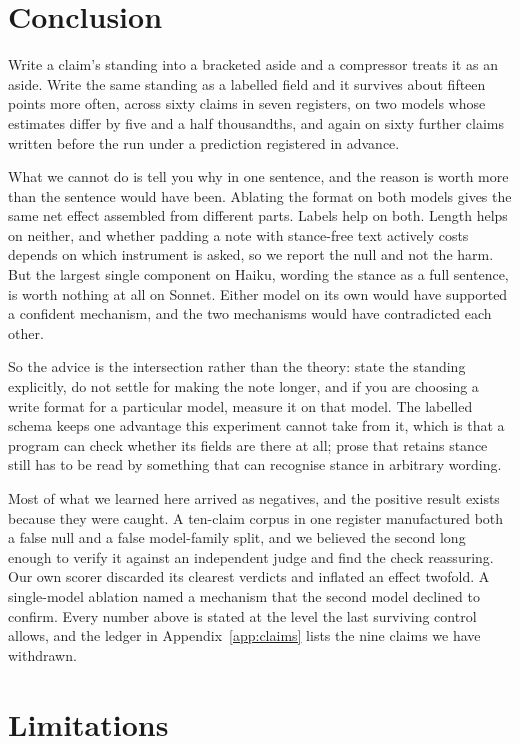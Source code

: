 \documentclass[11pt]{article}
\begin{document}
\section{Conclusion}

Write a claim's standing into a bracketed aside and a compressor treats it as an aside.
Write the same standing as a labelled field and it survives about fifteen points more
often, across sixty claims in seven registers, on two models whose estimates differ by five and a half thousandths, and again on sixty further claims written before the run under a
prediction registered in advance.

What we cannot do is tell you why in one sentence, and the reason is worth more than the
sentence would have been. Ablating the format on both models gives the same net effect
assembled from different parts. Labels help on both. Length helps on neither, and whether
padding a note with stance-free text actively costs depends on which instrument is asked,
so we report the null and not the harm. But the largest single
component on Haiku, wording the stance as a full sentence, is worth nothing at all on
Sonnet. Either model on its own would have supported a confident mechanism, and the two
mechanisms would have contradicted each other.

So the advice is the intersection rather than the theory: state the standing explicitly,
do not settle for making the note longer, and if you are choosing a write format for a
particular model, measure it on that model. The labelled schema keeps one advantage this
experiment cannot take from it, which is that a program can check whether its fields are
there at all; prose that retains stance still has to be read by something that can
recognise stance in arbitrary wording.

Most of what we learned here arrived as negatives, and the positive result exists because
they were caught. A ten-claim corpus in one register manufactured both a false null and a
false model-family split, and we believed the second long enough to verify it against an
independent judge and find the check reassuring. Our own scorer discarded its clearest
verdicts and inflated an effect twofold. A single-model ablation named a mechanism that
the second model declined to confirm. Every number above is stated at the level the last
surviving control allows, and the ledger in Appendix~\ref{app:claims} lists the nine
claims we have withdrawn.

\section*{Limitations}
\end{document}
